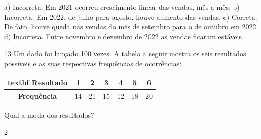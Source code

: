 \begin{escolha}
\begin{boxmedio}
\begin{boxmedio}
{\begin{boxpeq}
\begin{boxpeq}
{\begin{boxpeq}
\begin{boxmedio}
\begin{boxmedio}
\begin{boxpeq}
\begin{boxmedio}
\begin{boxpeq}
\begin{boxpeq}
\begin{boxpeq}
\begin{boxpeq}
\begin{boxmedio}
{\begin{boxmedio}
\begin{boxmedio}
\begin{boxpeq}
\begin{boxmedio}
\begin{boxpeq}
\begin{boxpeq}
\begin{boxpeq}
\begin{escolha}
{\begin{boxmedio}
\begin{boxpeq}
\begin{boxpeq}
\begin{boxpeq}
\begin{boxpeq}
\begin{boxpeq}
\begin{boxmedio}
\begin{boxpeq}
\begin{boxpeq}
\begin{boxpeq}
{\begin{boxpeq}
\begin{boxmedio}
\begin{boxpeq}
\begin{boxpeq}
\begin{boxpeq}
{\begin{boxpeq}
\begin{boxmedio}
{\begin{boxpeq}
\begin{boxpeq}
\begin{boxmedio}
\begin{boxmedio}
\begin{boxpeq}
\begin{boxpeq}
{\begin{boxpeq}
\begin{boxpeq}
\begin{boxpeq}
\begin{boxpeq}
\begin{boxpeq}
\begin{escolha}
\begin{escolha}
{\begin{boxmedio}
\begin{boxpeq}
\begin{q°}
\begin{boxmedio}
\begin{boxpeq}
\begin{boxpeq}
\begin{boxmedio}
\begin{boxmedio}
\begin{boxmedio}
\begin{boxmedio}
{\begin{escolha}
\begin{escolha}
\begin{escolha}
\begin{escolha}
\begin{escolha}
\begin{escolha}
{a) Incorreta. Em 2021 ocorreu crescimento linear das vendas, mês a mês.
b) Incorreta. Em 2022, de julho para agosto, houve aumento das vendas.
c) Correta. De fato, houve queda nas vendas do mês de setembro para 
o de outubro em 2022 
d) Incorreta. Entre novembro e dezembro de 2022 as vendas ficaram 
estáveis.}

\num{13} Um dado foi lançado 100 vezes. A tabela a seguir mostra os seis
resultados possíveis e as suas respectivas frequências de ocorrências:

\begin{table}[]
\begin{tabular}{|c|c|c|c|c|c|c|}
  \hline textbf
  {Resultado} & 1 & 2 & 3 & 4 & 5 & 6 \\ \hline
\textbf{Frequência} & 14 & 21 & 15 & 12 & 18 & 20 \\ \hline
\end{tabular}
\end{table}

Qual a moda dos resultados?

\begin{escolha}

  \item 2


\end{escolha}
\end{escolha}
\end{escolha}
\end{escolha}
\end{escolha}
\end{escolha}
\end{escolha}}
\end{boxmedio}
\end{boxmedio}
\end{boxmedio}
\end{boxmedio}
\end{boxpeq}
\end{boxpeq}
\end{boxmedio}
\end{q°}
\end{boxpeq}
\end{boxmedio}}
\end{escolha}
\end{escolha}
\end{boxpeq}
\end{boxpeq}
\end{boxpeq}
\end{boxpeq}
\end{boxpeq}}
\end{boxpeq}
\end{boxpeq}
\end{boxmedio}
\end{boxmedio}
\end{boxpeq}
\end{boxpeq}}
\end{boxmedio}
\end{boxpeq}}
\end{boxpeq}
\end{boxpeq}
\end{boxpeq}
\end{boxmedio}
\end{boxpeq}}
\end{boxpeq}
\end{boxpeq}
\end{boxpeq}
\end{boxmedio}
\end{boxpeq}
\end{boxpeq}
\end{boxpeq}
\end{boxpeq}
\end{boxpeq}
\end{boxmedio}}
\end{escolha}
\end{boxpeq}
\end{boxpeq}
\end{boxpeq}
\end{boxmedio}
\end{boxpeq}
\end{boxmedio}
\end{boxmedio}}
\end{boxmedio}
\end{boxpeq}
\end{boxpeq}
\end{boxpeq}
\end{boxpeq}
\end{boxmedio}
\end{boxpeq}
\end{boxmedio}
\end{boxmedio}
\end{boxpeq}}
\end{boxpeq}
\end{boxpeq}}
\end{boxmedio}
\end{boxmedio}
\end{escolha}
